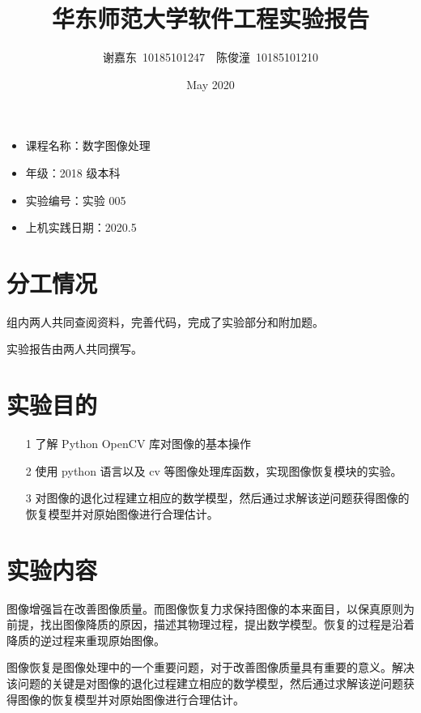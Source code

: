 \documentclass[11pt]{ctexart}
\title{华东师范大学软件工程实验报告}
\author{谢嘉东\ 10185101247\ \ 陈俊潼\ 10185101210}
\date{May 2020}
\begin{document}
\maketitle

\thispagestyle{empty}

\begin{itemize}
    \item 课程名称：数字图像处理
    \item 年级：2018 级本科
    \item 实验编号：实验 005
    \item 上机实践日期：2020.5
\end{itemize}

\tableofcontents

\thispagestyle{empty}

\newpage

\section{分工情况}

组内两人共同查阅资料，完善代码，完成了实验部分和附加题。

实验报告由两人共同撰写。

\section{实验目的}

\begin{itemize}
    \item [1] 了解 Python OpenCV 库对图像的基本操作
    \item [2] 使用 python 语言以及 cv 等图像处理库函数，实现图像恢复模块的实验。
    \item [3] 对图像的退化过程建立相应的数学模型，然后通过求解该逆问题获得图像的恢复模型并对原始图像进行合理估计。
\end{itemize}

\section{实验内容}

图像增强旨在改善图像质量。而图像恢复力求保持图像的本来面目，以保真原则为前提，找出图像降质的原因，描述其物理过程，提出数学模型。恢复的过程是沿着降质的逆过程来重现原始图像。

图像恢复是图像处理中的一个重要问题，对于改善图像质量具有重要的意义。解决该问题的关键是对图像的退化过程建立相应的数学模型，然后通过求解该逆问题获得图像的恢复模型并对原始图像进行合理估计。
\end{document}
